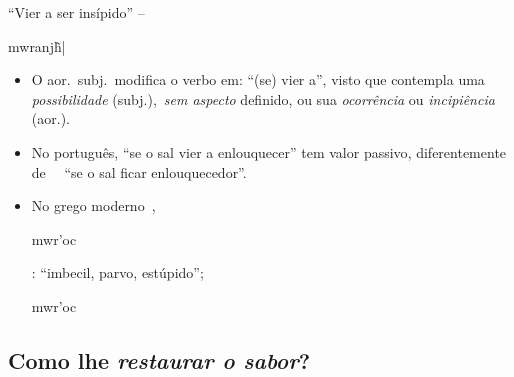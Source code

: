 \documentclass[12pt,aspectratio=169]{beamer}
\newcommand{\RED}[1]{{\textcolor{TXred}{#1}}}
\newcommand{\YEL}[1]{{\textcolor{TXyel}{#1}}}
\newcommand{\GRE}[1]{{\textcolor{TXgre}{#1}}}
\newcommand{\CYA}[1]{{\textcolor{TXcya}{#1}}}
\newcommand{\MAG}[1]{{\textcolor{TXmag}{#1}}}
\newcommand{\BRI}[1]{{\textcolor{BSpbg}{#1}}}   %
\newcommand{\GRtxt}[1]{\begin{otherlanguage}{greek}{{#1}}\end{otherlanguage}}
\begin{document}
    \begin{frame}{\BRI{``Vier a ser insípido''} -- \GRtxt{mwranj\~h|}}
        \begin{itemize}
            \item<1-> O \GRE{aor.~subj.}~modifica o verbo em: \CYA{``}(se) \CYA{vier a''}, visto
                que contempla uma \BRI{\textit{possibilidade}} (\GRE{subj.}),~\BRI{\textit{sem
                aspecto}} definido, ou sua \BRI{\textit{ocorrência}} ou
                \BRI{\textit{incipiência}} (\GRE{aor.}).
                \\[\medskipamount]
            \item<2-> No português, \MAG{``se o sal vier a enlouquecer''} tem valor
                \GRE{passivo}, diferentemente de \ \ \RED{``se o sal ficar enlouquecedor''}.
                \\[\medskipamount]
            \item<7-> No grego moderno~\cite{1997-ManiatoglouMPF-Porto}, \YEL{\GRtxt{mwr'oc}}:
                ``imbecil, parvo, estúpido''; \YEL{\GRtxt{mwr'oc}}
        \end{itemize}
    \end{frame}

    \subsection{Como lhe \textit{restaurar o sabor\/}?}
\end{document}
